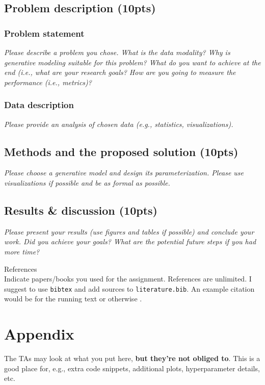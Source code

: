 \documentclass[a4 paper]{article}
\begin{document}
\subsection{Problem description (10pts)} 
\subsubsection{Problem statement} 
\textit{Please describe a problem you chose. What is the data modality? Why is generative modeling suitable for this problem? What do you want to achieve at the end (i.e., what are your research goals? How are you going to measure the performance (i.e., metrics)?}

\subsubsection{Data description}
\textit{Please provide an analysis of chosen data (e.g., statistics, visualizations).}

\subsection{Methods and the proposed solution (10pts)}
\textit{Please choose a generative model and design its parameterization. Please use visualizations if possible and be as formal as possible.}

\subsection{Results \& discussion (10pts)}
\textit{Please present your results (use figures and tables if possible) and conclude your work. Did you achieve your goals? What are the potential future steps if you had more time?}

\newpage
References\\
Indicate papers/books you used for the assignment. References are unlimited. I suggest to use \texttt{bibtex} and add sources to \texttt{literature.bib}. An example citation would be \cite{tomczak2022deep} for the running text or otherwise \citep{tomczak2022deep}.

\renewcommand\bibliographytypesize{\small}



\appendix
\section*{Appendix}

The TAs may look at what you put here, \textbf{but they're not obliged to}. This is a good place for, e.g., extra code snippets, additional plots, hyperparameter details, etc.
\end{document}
